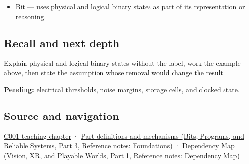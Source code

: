 \begin{itemize}
\tightlist
\item
  \hyperref[appendix-ddbb69998a2e]{Bit} --- uses physical and logical binary states as part of its representation or reasoning.
\end{itemize}

\subsection{Recall and next depth}\label{appendix-ea798b1ceb35-recall-and-next-depth}

\hypertarget{appendix-ea798b1ceb35-recall-and-next-depth}{}

Explain physical and logical binary states without the label, work the example above, then state the assumption whose removal would change the result.

\textbf{Pending:} electrical thresholds, noise margins, storage cells, and clocked state.

\subsection{Source and navigation}\label{appendix-ea798b1ceb35-source-and-navigation}

\hypertarget{appendix-ea798b1ceb35-source-and-navigation}{}

\hyperref[01-foundations-i-ch001-from-a-signal-to-an-interpretation]{C001 teaching chapter} · \href{../01-Bits-Programs-and-Reliable-Systems-P03/main.pdf\#appendix-fd090d982a15}{Part definitions and mechanisms (Bits, Programs, and Reliable Systems, Part 3, Reference notes: Foundations)} · \href{../07-Vision-XR-and-Playable-Worlds-P01/main.pdf\#appendix-4ad47bdd269a}{Dependency Map (Vision, XR, and Playable Worlds, Part 1, Reference notes: Dependency Map)}
